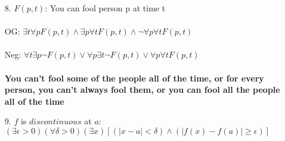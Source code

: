 \documentclass[11pt]{exam}
\begin{document}
\begin{enumerate}[leftmargin=0pt]
\item[8.] $F(p,t)$: You can fool person p at time t \\
\\
OG: $\exists t \forall p F(p,t) \land \exists p \forall t F(p,t) \land \neg \forall p \forall t F(p,t)$ \\
\\
Neg: $\forall t \exists p \neg F(p,t) \lor \forall p \exists t \neg F(p,t) \lor \forall p \forall t F(p,t)$ \\
\\
\textbf{You can't fool some of the people all of the time, or for every person, you can't always fool them, or you can fool all the people all of the time}

\item[9.] $f$ is $discontinuous$ at $a$: $(\exists \epsilon > 0)(\forall \delta > 0)(\exists x)[(|x - a| < \delta) \land (|f(x) - f(a)| \geq \epsilon)]$


\end{enumerate}
\end{document}
